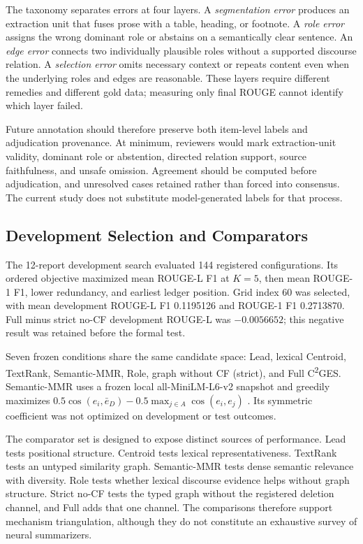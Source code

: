 \documentclass[applsci,article,submit,moreauthors]{Definitions/mdpi}
\newcommand{\cges}{C\textsuperscript{2}GES}
\begin{document}
The taxonomy separates errors at four layers. A \textit{segmentation error} produces an extraction unit that fuses prose with a table, heading, or footnote. A \textit{role error} assigns the wrong dominant role or abstains on a semantically clear sentence. An \textit{edge error} connects two individually plausible roles without a supported discourse relation. A \textit{selection error} omits necessary context or repeats content even when the underlying roles and edges are reasonable. These layers require different remedies and different gold data; measuring only final ROUGE cannot identify which layer failed.

Future annotation should therefore preserve both item-level labels and adjudication provenance. At minimum, reviewers would mark extraction-unit validity, dominant role or abstention, directed relation support, source faithfulness, and unsafe omission. Agreement should be computed before adjudication, and unresolved cases retained rather than forced into consensus. The current study does not substitute model-generated labels for that process.

\subsection{Development Selection and Comparators}

The 12-report development search evaluated 144 registered configurations. Its ordered objective maximized mean ROUGE-L F1 at $K=5$, then mean ROUGE-1 F1, lower redundancy, and earliest ledger position. Grid index 60 was selected, with mean development ROUGE-L F1 0.1195126 and ROUGE-1 F1 0.2713870. Full minus strict no-CF development ROUGE-L was $-0.0056652$; this negative result was retained before the formal test.

Seven frozen conditions share the same candidate space: Lead, lexical Centroid, TextRank, Semantic-MMR, Role, graph without CF (strict), and Full \cges{}. Semantic-MMR uses a frozen local all-MiniLM-L6-v2 snapshot and greedily maximizes $0.5\cos(e_i,\bar e_D)-0.5\max_{j\in A}\cos(e_i,e_j)$ \cite{reimers2019sentencebert}. Its symmetric coefficient was not optimized on development or test outcomes.

The comparator set is designed to expose distinct sources of performance. Lead tests positional structure. Centroid tests lexical representativeness. TextRank tests an untyped similarity graph. Semantic-MMR tests dense semantic relevance with diversity. Role tests whether lexical discourse evidence helps without graph structure. Strict no-CF tests the typed graph without the registered deletion channel, and Full adds that one channel. The comparisons therefore support mechanism triangulation, although they do not constitute an exhaustive survey of neural summarizers.
\end{document}
